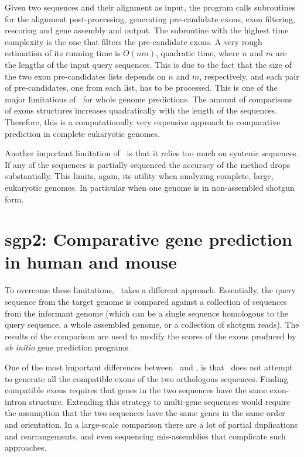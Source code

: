 Given two sequences and their alignment as input, the program calls
subroutines for the alignment post-processing, generating
pre-candidate exons, exon filtering, rescoring and gene assembly and
output. The subroutine with the highest time complexity is the one
that filters the pre-candidate exons. A very rough estimation of its
running time is $O(nm)$, quadratic time, where $n$ and $m$ are the
lengths of the input query sequences. This is due to the fact that the
size of the two exon pre-candidates lists depends on $n$ and $m$,
respectively, and each pair of pre-candidates, one from each list, has
to be processed. This is one of the major limitations of \sgpo\ for
whole genome predictions. The amount of comparisons of exons
structures increases quadratically with the length of the
sequences. Therefore, this is a computationally very expensive
approach to comparative prediction in complete eukaryotic genomes.

Another important limitation of \sgpo\ is that it relies too much on
syntenic sequences. If any of the sequences is partially sequenced the
accuracy of the method drops substantially. This limits, again, its
utility when analyzing complete, large, eukaryotic genomes. In
particular when one genome is in non-assembled shotgun form.

\section{sgp2: Comparative gene prediction in human and mouse}

To overcome these limitations, \sgp\ takes a different approach.
Essentially, the query sequence from the target genome is compared
against a collection of sequences from the informant genome (which can
be a single sequence homologous to the query sequence, a whole
assembled genome, or a collection of shotgun reads). The results
of the comparison are used to modify the scores of the exons produced
by \textit{ab initio} gene prediction programs.

One of the most important differences between \sgpo\ and \sgp, is that
\sgp\ does not attempt to generate all the compatible exons of the two
orthologous sequences. Finding compatible exons requires that genes in
the two sequences have the same exon-intron structure. Extending this
strategy to multi-gene sequences would require the assumption that the
two sequences have the same genes in the same order and orientation.
In a large-scale comparison there are a lot of partial duplications
and rearrangements, and even sequencing mis-assemblies that complicate
such approaches.

